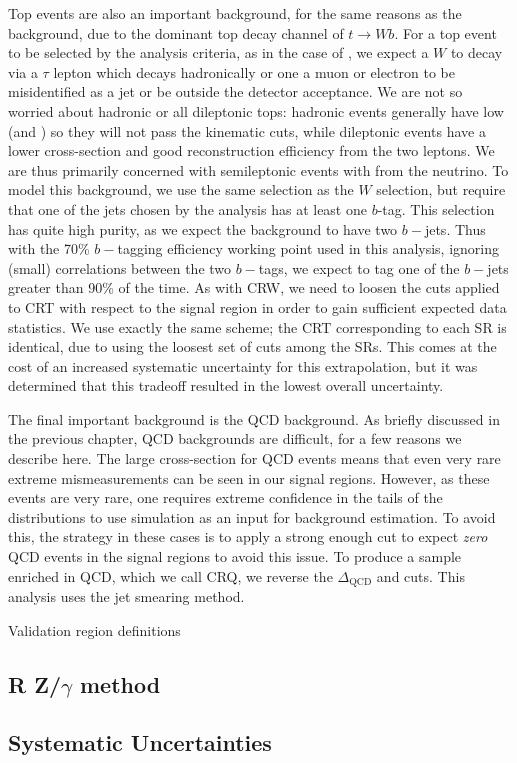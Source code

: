 Top events are also an important background, for the same reasons as the \wjets background, due to the dominant top decay channel of $t \rightarrow Wb$.
For a top event to be selected by the analysis criteria, as in the case of \wjets, we expect a $W$ to decay via a $\tau$ lepton which decays hadronically or one a muon or electron to be misidentified as a jet or be outside the detector acceptance.
We are not so worried about hadronic or all dileptonic tops: hadronic \ttbar events generally have low \met (and ) so they will not pass the kinematic cuts, while dileptonic \ttbar events have a lower cross-section and good reconstruction efficiency from the two leptons.
We are thus primarily concerned with semileptonic \ttbar events with \met from the neutrino.
To model this background, we use the same selection as the $W$ selection, but require that one of the jets chosen by the analysis has at least one $b$-tag.
This selection has quite high purity, as we expect the \ttbar background to have two $b-$jets.
Thus with the 70\% $b-$tagging efficiency working point used in this analysis, ignoring (small) correlations between the two $b-$tags, we expect to tag one of the $b-$jets greater than 90\% of the time.
As with CRW, we need to loosen the cuts applied to CRT with respect to the signal region in order to gain sufficient expected data statistics.
We use exactly the same scheme; the CRT corresponding to each SR is identical, due to using the loosest set of cuts among the SRs.
This comes at the cost of an increased systematic uncertainty for this extrapolation, but it was determined that this tradeoff resulted in the lowest overall uncertainty.

The final important background is the QCD background.
As briefly discussed in the previous chapter, QCD backgrounds are difficult, for a few reasons we describe here.
The large cross-section for QCD events means that even very rare extreme mismeasurements can be seen in our signal regions.
However, as these events are very rare, one requires extreme confidence in the tails of the distributions to use simulation as an input for background estimation.
To avoid this, the strategy in these cases is to apply a strong enough cut to expect \textit{zero} QCD events in the signal regions to avoid this issue.
To produce a sample enriched in QCD, which we call CRQ, we reverse the $\Delta_{\mathrm{QCD}}$ and  cuts.
This analysis uses the jet smearing method.

Validation region definitions

\subsection{R Z/$\gamma$ method}

\subsection{Systematic Uncertainties}
